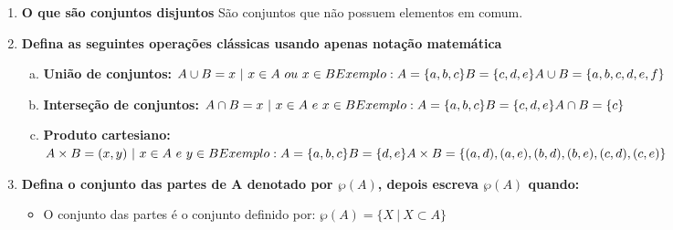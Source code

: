 \documentclass{article}
\begin{document}
  \begin{enumerate}
    \item \textbf{O que são conjuntos disjuntos} \newline
    São conjuntos que não possuem elementos em comum.
    \item \textbf{Defina as seguintes operações clássicas usando apenas notação matemática}
    \begin{enumerate}[(a)]
      \item \textbf{União de conjuntos:}
      \begin{math}
        \\ A \cup B = x  \ | \ x \in A  \ ou \ x  \in B \\
        Exemplo: \\
        A = \{ a,b,c \} \\
        B = \{ c,d,e \} \\
        A \cup B = \{a,b,c,d,e,f\}
      \end{math}
      \item \textbf{Interseção de conjuntos:}
      \begin{math}
        \\ A \cap B = x \ | \ x \in A \ e \ x \in B \\
        Exemplo: \\
        A = \{ a,b,c \} \\
        B = \{ c,d,e \} \\
        A \cap B = \{c\}
      \end{math}
      \item \textbf{Produto cartesiano:}
      \begin{math}
        \\ A \times B =  (x,y) \ | \ x \in A \ e \ y \in B \\
        Exemplo: \\
        A = \{ a,b,c \} \\
        B = \{ d,e \} \\
        A \times B = \{ (a,d),(a,e),(b,d),(b,e),(c,d),(c,e)\}
      \end{math}
    \end{enumerate}
    \item \textbf{Defina o conjunto das partes de A denotado por $\wp(A)$, depois escreva  $ \wp(A) $ quando:}
    \begin{itemize}
      \item O conjunto das partes é o conjunto definido por:
      \begin{math}
        \wp(A) = \{ X \ | \ X \subset A \}

\end{math}
\end{itemize}
\end{enumerate}
\end{document}
